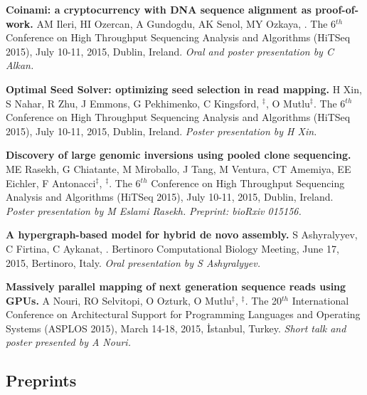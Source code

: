 \vspace{-.2cm}
 {\bf Coinami: a cryptocurrency with DNA sequence alignment as proof-of-work.}
  AM Ileri, HI Ozercan, A Gundogdu, AK Senol, MY Ozkaya, \calkan{}.
The 6$^{th}$ Conference on High Throughput Sequencing Analysis and Algorithms (HiTSeq 2015), 
July 10-11, 2015, Dublin, Ireland. {\it Oral and poster presentation by C Alkan.}



\vspace{-.2cm}        
       {\bf Optimal Seed Solver: optimizing seed selection in read mapping.}
       H Xin, S Nahar, R Zhu, J Emmons, G Pekhimenko, C Kingsford, \calkan{}$^\ddag$, O Mutlu$^\ddag$.
 The 6$^{th}$ Conference on High Throughput Sequencing Analysis and Algorithms (HiTSeq 2015), 
July 10-11, 2015, Dublin, Ireland. {\it Poster presentation by H Xin.}



\vspace{-.2cm}
{\bf Discovery of large genomic inversions using pooled clone sequencing.}
ME Rasekh, G Chiatante, M Miroballo, J Tang, M Ventura, CT Amemiya, EE Eichler, F Antonacci$^\ddag$, \calkan{}$^\ddag$.
 The 6$^{th}$ Conference on High Throughput Sequencing Analysis and Algorithms (HiTSeq 2015), 
July 10-11, 2015, Dublin, Ireland. {\it Poster presentation by M Eslami Rasekh.} \textit{Preprint: bioRxiv 015156.}

\vspace{-.2cm}
  {\bf  A hypergraph-based model for hybrid de novo assembly.}
  S Ashyralyyev, C Firtina, C Aykanat, \calkan{}.
  Bertinoro Computational Biology Meeting, June 17, 2015, Bertinoro, Italy. {\it Oral presentation by S Ashyralyyev.}


\vspace{-.2cm}
 {\bf Massively parallel mapping of next generation sequence reads using GPUs.}
  A Nouri, RO Selvitopi, O Ozturk, O Mutlu$^\ddag$, \calkan{}$^\ddag$.
 The 20$^{th}$ International Conference on Architectural Support for Programming Languages and Operating Systems (ASPLOS 2015), 
March 14-18, 2015, İstanbul, Turkey. {\it Short talk and poster presented by A Nouri.}



\vspace{-.4cm}
\subsection{\small \sc  Preprints}
 \vspace{-0.6cm}


